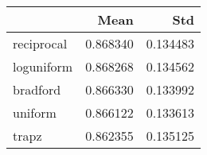 \begin{tabular}{lrr}
\toprule
{} &      Mean &       Std \\
\midrule
reciprocal &  0.868340 &  0.134483 \\
loguniform &  0.868268 &  0.134562 \\
bradford   &  0.866330 &  0.133992 \\
uniform    &  0.866122 &  0.133613 \\
trapz      &  0.862355 &  0.135125 \\
\bottomrule
\end{tabular}
